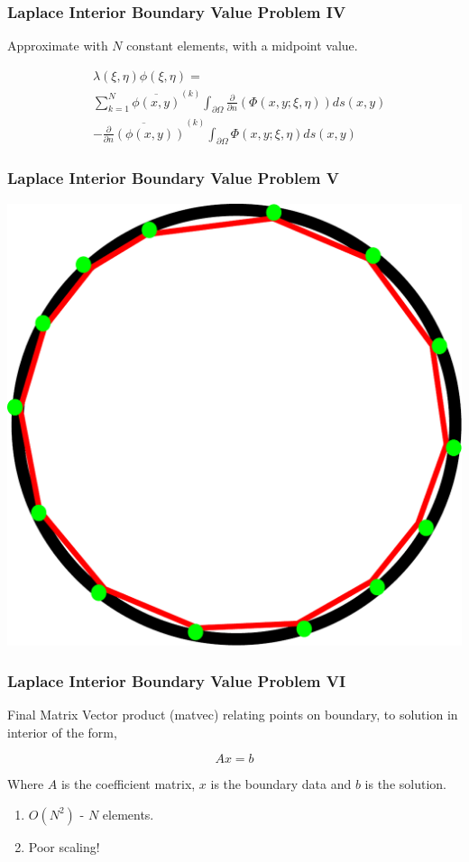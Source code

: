 \begin{frame}
    \frametitle{Laplace Interior Boundary Value Problem IV}

        Approximate with $N$ constant elements, with a midpoint value.

        \begin{equation}
            \begin{aligned}
                & \lambda(\xi, \eta)\phi(\xi, \eta) = \\
                & \sum_{k=1}^N  \overline{\phi(x, y)}^{(k)} \int_{\partial \Omega} \frac{\partial}{\partial n} (\Phi(x, y; \xi, \eta)) ds(x,y) \\
                &- \overline{\frac{\partial}{\partial n}(\phi(x, y))}^{(k)}  \int_{\partial \Omega} \Phi(x, y; \xi, \eta)  ds(x, y)
            \end{aligned}
        \end{equation}
\end{frame}

\begin{frame}
    \frametitle{Laplace Interior Boundary Value Problem V}
    \centering \includegraphics[width=0.5\linewidth]{assets/bem.pdf}
\end{frame}

\begin{frame}
    \frametitle{Laplace Interior Boundary Value Problem VI}

    Final Matrix Vector product (matvec) relating points on boundary, to solution in interior of the form,

    \begin{equation}
        Ax = b
    \end{equation}

    Where $A$ is the coefficient matrix, $x$ is the boundary data and $b$ is the solution.

    \begin{enumerate}
        \item $O(N^2)$ - $N$ elements.
        \item Poor scaling!
    \end{enumerate}
\end{frame}

